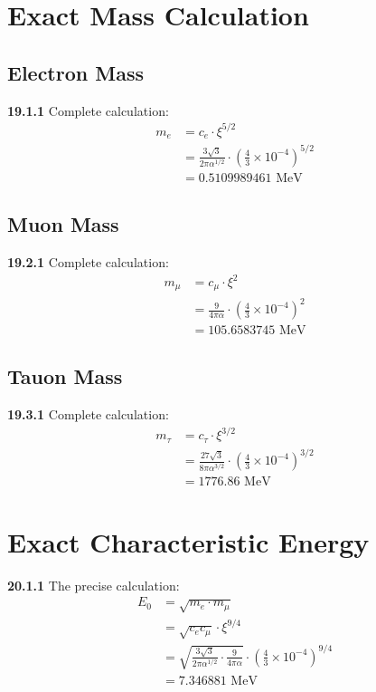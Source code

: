 \documentclass[12pt,a4paper]{article}
\begin{document}
\section{Exact Mass Calculation}

\subsection{Electron Mass}
\noindent \textbf{19.1.1} Complete calculation:
\begin{align}
	m_e &= c_e \cdot \xi^{5/2} \\
	&= \frac{3\sqrt{3}}{2\pi\alpha^{1/2}} \cdot \left(\frac{4}{3} \times 10^{-4}\right)^{5/2} \\
	&= 0.5109989461 \text{ MeV}
\end{align}

\subsection{Muon Mass}
\noindent \textbf{19.2.1} Complete calculation:
\begin{align}
	m_\mu &= c_\mu \cdot \xi^2 \\
	&= \frac{9}{4\pi\alpha} \cdot \left(\frac{4}{3} \times 10^{-4}\right)^2 \\
	&= 105.6583745 \text{ MeV}
\end{align}

\subsection{Tauon Mass}
\noindent \textbf{19.3.1} Complete calculation:
\begin{align}
	m_\tau &= c_\tau \cdot \xi^{3/2} \\
	&= \frac{27\sqrt{3}}{8\pi\alpha^{3/2}} \cdot \left(\frac{4}{3} \times 10^{-4}\right)^{3/2} \\
	&= 1776.86 \text{ MeV}
\end{align}

\section{Exact Characteristic Energy}
\noindent \textbf{20.1.1} The precise calculation:
\begin{align}
	E_0 &= \sqrt{m_e \cdot m_\mu} \\
	&= \sqrt{c_e c_\mu} \cdot \xi^{9/4} \\
	&= \sqrt{\frac{3\sqrt{3}}{2\pi\alpha^{1/2}} \cdot \frac{9}{4\pi\alpha}} \cdot \left(\frac{4}{3} \times 10^{-4}\right)^{9/4} \\
	&= 7.346881 \text{ MeV}
\end{align}
\end{document}
